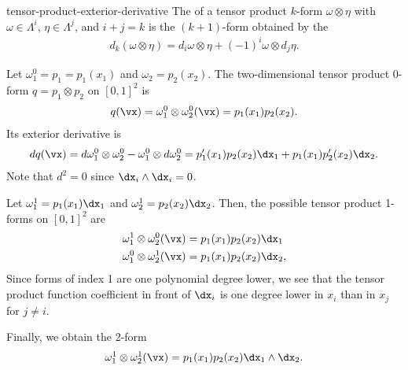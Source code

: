 \begin{Lemma}{tensor-product-exterior-derivative}
  The  of a tensor product $k$-form
  $\omega\otimes\eta$ with $\omega\in\Lambda^i$,
  $\eta\in\Lambda^j$, and $i+j=k$ is the $(k+1)$-form obtained by the
  \begin{gather}
    d_k(\omega\otimes\eta) = d_i\omega \otimes \eta +  (-1)^i \omega \otimes d_j\eta.
  \end{gather}
\end{Lemma}

\begin{example}
  Let $\omega_1^0 = p_1 = p_1(x_1)$ and $\omega_2 = p_2(x_2)$.
  The two-dimensional tensor product $0$-form $q=p_1\otimes p_2$ on $[0,1]^2$ is
  \begin{gather}
    q(\vx) = \omega_1^0\otimes \omega_2^0(\vx) = p_1(x_1)p_2(x_2).
  \end{gather}
  Its exterior derivative is
  \begin{gather}
    d q(\vx) = d\omega_1^0 \otimes \omega_2^0 - \omega_1^0 \otimes d\omega_2^0
    = p_1'(x_1) p_2(x_2) \dx_1 + p_1(x_1) p_2'(x_2) \dx_2.
  \end{gather}
  Note that $d^2 = 0$ since $\dx_i\wedge \dx_i=0$.
  
  Let $\omega_1^1 = p_1(x_1)\dx_1$ and $\omega_2^1 = p_2(x_2)\dx_2$. Then, the
  possible tensor product 1-forms on $[0,1]^2$ are
  \begin{align}
    \omega_1^1 \otimes \omega_2^0 (\vx) &= p_1(x_1)p_2(x_2) \dx_1 \\
    \omega_1^0 \otimes \omega_2^1 (\vx) &= p_1(x_1)p_2(x_2) \dx_2,
  \end{align}
  Since forms of index 1 are one polynomial degree lower, we see that
  the tensor product function coefficient in front of $\dx_i$ is one
  degree lower in $x_i$ than in $x_j$ for $j\neq i$.

  Finally, we obtain the 2-form
  \begin{gather}
    \omega_1^1 \otimes \omega_2^1 (\vx) = p_1(x_1)p_2(x_2) \dx_1\wedge\dx_2.    
  \end{gather}
\end{example}

